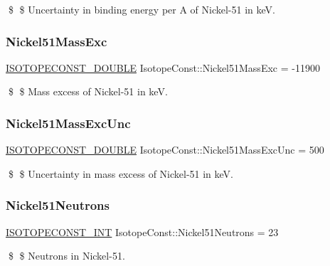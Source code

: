 \$ \$ Uncertainty in binding energy per A of Nickel-\/51 in keV. \mbox{\label{group___isotope_const-_nickel-_ni51_ga6fe5efa09f28078c9e81e10a0543f238}} 
\subsubsection{\texorpdfstring{Nickel51\+Mass\+Exc}{Nickel51MassExc}}
{\footnotesize\ttfamily \mbox{\hyperlink{group___isotope_const-_macros_ga8f45a7272ce02c0b4c65c44636ed719a}{I\+S\+O\+T\+O\+P\+E\+C\+O\+N\+S\+T\+\_\+\+D\+O\+U\+B\+LE}} Isotope\+Const\+::\+Nickel51\+Mass\+Exc = -\/11900}

\$ \$ Mass excess of Nickel-\/51 in keV. \mbox{\label{group___isotope_const-_nickel-_ni51_ga2a1a644afb9d0e0804e81429623abec7}} 
\subsubsection{\texorpdfstring{Nickel51\+Mass\+Exc\+Unc}{Nickel51MassExcUnc}}
{\footnotesize\ttfamily \mbox{\hyperlink{group___isotope_const-_macros_ga8f45a7272ce02c0b4c65c44636ed719a}{I\+S\+O\+T\+O\+P\+E\+C\+O\+N\+S\+T\+\_\+\+D\+O\+U\+B\+LE}} Isotope\+Const\+::\+Nickel51\+Mass\+Exc\+Unc = 500}

\$ \$ Uncertainty in mass excess of Nickel-\/51 in keV. \mbox{\label{group___isotope_const-_nickel-_ni51_ga587b63f9389c5b5a2c7ac3cc1570bc63}} 
\subsubsection{\texorpdfstring{Nickel51\+Neutrons}{Nickel51Neutrons}}
{\footnotesize\ttfamily \mbox{\hyperlink{group___isotope_const-_macros_ga5f18360b3e99483a35c32d789e62621c}{I\+S\+O\+T\+O\+P\+E\+C\+O\+N\+S\+T\+\_\+\+I\+NT}} Isotope\+Const\+::\+Nickel51\+Neutrons = 23}

\$ \$ Neutrons in Nickel-\/51. \mbox{\label{group___isotope_const-_nickel-_ni51_ga8dc4044d5b750018dbf3ff73cb711746}} 
